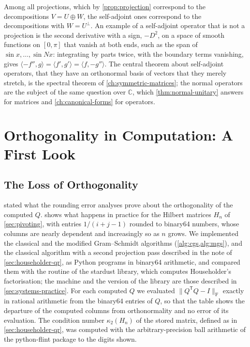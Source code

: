 Among all projections, which by \cref{prop:projection} correspond to the decompositions $V=U\oplus W$, the self-adjoint ones correspond to the decompositions with $W=U^\perp$. An example of a self-adjoint operator that is not a projection is the second derivative with a sign, $-D^2$, on a space of smooth functions on $[0,\pi]$ that vanish at both ends, such as the span of $\sin x,\ldots,\sin Nx$: integrating by parts twice, with the boundary terms vanishing, gives $\langle-f'',g\rangle=\langle f',g'\rangle=\langle f,-g''\rangle$. The central theorem about self-adjoint operators, that they have an orthonormal basis of vectors that they merely stretch, is the spectral theorem of \cref{ch:symmetric-matrices}; the normal operators are the subject of the same question over $\mathbb C$, which \cref{thm:normal-unitary} answers for matrices and \cref{ch:canonical-forms} for operators.

\section{Orthogonality in Computation: A First Look}
\label{sec:orthogonality-computation}

\subsection{The Loss of Orthogonality}

 stated what the rounding error analyses prove about the orthogonality of the computed $Q$.  shows what happens in practice for the Hilbert matrices $H_n$ of \cref{sec:pivoting}, with entries $1/(i+j-1)$ rounded to binary64 numbers, whose columns are nearly dependent and increasingly so as $n$ grows. We implemented the classical and the modified Gram--Schmidt algorithms (\cref{alg:cgs,alg:mgs}), and the classical algorithm with a second projection pass described in the note of \cref{sec:householder-qr}, as Python programs in binary64 arithmetic, and compared them with the routine  of the stardust library, which computes Householder's factorisation; the machine and the version of the library are those described in \cref{sec:systems-practice}. For each computed $Q$ we evaluated $\|Q^{\mathsf T}Q-I\|_{\mathrm F}$ exactly in rational arithmetic from the binary64 entries of $Q$, so that the table shows the departure of the computed columns from orthonormality and no error of its evaluation. The condition number $\kappa_2(H_n)$ of the stored matrix, defined as in \cref{sec:householder-qr}, was computed with the arbitrary-precision ball arithmetic of the python-flint package to the digits shown.

